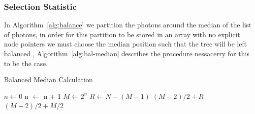 \subsubsection{Selection Statistic}
In Algorithm~\ref{alg:balance} we partition the photons around the median of the list of photons, in order for
this partition to be stored in an array with no explicit node pointers we must choose the median position such
that the tree will be left balanced \cite{baerentzen03}, Algorithm~\ref{alg:bal-median} describes the procedure nessacerry for this
to be the case.

\begin{algorithm}
\caption{Balanced Median Calculation}
\label{alg:bal-median}
\begin{algorithmic}
\State $n \gets 0$
	\State n $\gets$ n + 1
\EndWhile
\State $M \gets 2^n$
\State $R \gets N - (M - 1)$
	\State \Return $(M - 2) / 2 + R$
\Else
	\State \Return $(M - 2) / 2 + M / 2$
\EndIf
\end{algorithmic}
\end{algorithm}
